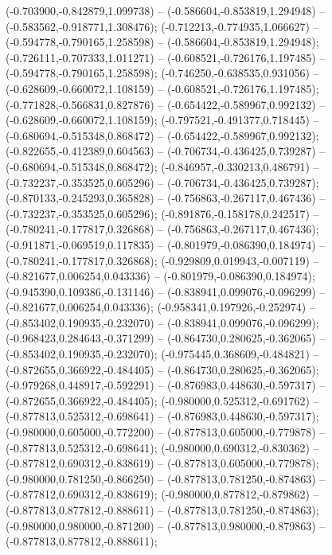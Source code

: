 (-0.703900,-0.842879,1.099738) -- (-0.586604,-0.853819,1.294948) -- (-0.583562,-0.918771,1.308476);
 (-0.712213,-0.774935,1.066627) -- (-0.594778,-0.790165,1.258598) -- (-0.586604,-0.853819,1.294948);
 (-0.726111,-0.707333,1.011271) -- (-0.608521,-0.726176,1.197485) -- (-0.594778,-0.790165,1.258598);
 (-0.746250,-0.638535,0.931056) -- (-0.628609,-0.660072,1.108159) -- (-0.608521,-0.726176,1.197485);
 (-0.771828,-0.566831,0.827876) -- (-0.654422,-0.589967,0.992132) -- (-0.628609,-0.660072,1.108159);
 (-0.797521,-0.491377,0.718445) -- (-0.680694,-0.515348,0.868472) -- (-0.654422,-0.589967,0.992132);
 (-0.822655,-0.412389,0.604563) -- (-0.706734,-0.436425,0.739287) -- (-0.680694,-0.515348,0.868472);
 (-0.846957,-0.330213,0.486791) -- (-0.732237,-0.353525,0.605296) -- (-0.706734,-0.436425,0.739287);
 (-0.870133,-0.245293,0.365828) -- (-0.756863,-0.267117,0.467436) -- (-0.732237,-0.353525,0.605296);
 (-0.891876,-0.158178,0.242517) -- (-0.780241,-0.177817,0.326868) -- (-0.756863,-0.267117,0.467436);
 (-0.911871,-0.069519,0.117835) -- (-0.801979,-0.086390,0.184974) -- (-0.780241,-0.177817,0.326868);
 (-0.929809,0.019943,-0.007119) -- (-0.821677,0.006254,0.043336) -- (-0.801979,-0.086390,0.184974);
 (-0.945390,0.109386,-0.131146) -- (-0.838941,0.099076,-0.096299) -- (-0.821677,0.006254,0.043336);
 (-0.958341,0.197926,-0.252974) -- (-0.853402,0.190935,-0.232070) -- (-0.838941,0.099076,-0.096299);
 (-0.968423,0.284643,-0.371299) -- (-0.864730,0.280625,-0.362065) -- (-0.853402,0.190935,-0.232070);
 (-0.975445,0.368609,-0.484821) -- (-0.872655,0.366922,-0.484405) -- (-0.864730,0.280625,-0.362065);
 (-0.979268,0.448917,-0.592291) -- (-0.876983,0.448630,-0.597317) -- (-0.872655,0.366922,-0.484405);
 (-0.980000,0.525312,-0.691762) -- (-0.877813,0.525312,-0.698641) -- (-0.876983,0.448630,-0.597317);
 (-0.980000,0.605000,-0.772200) -- (-0.877813,0.605000,-0.779878) -- (-0.877813,0.525312,-0.698641);
 (-0.980000,0.690312,-0.830362) -- (-0.877812,0.690312,-0.838619) -- (-0.877813,0.605000,-0.779878);
 (-0.980000,0.781250,-0.866250) -- (-0.877813,0.781250,-0.874863) -- (-0.877812,0.690312,-0.838619);
 (-0.980000,0.877812,-0.879862) -- (-0.877813,0.877812,-0.888611) -- (-0.877813,0.781250,-0.874863);
 (-0.980000,0.980000,-0.871200) -- (-0.877813,0.980000,-0.879863) -- (-0.877813,0.877812,-0.888611);
